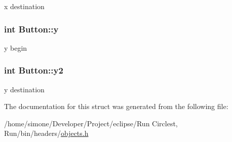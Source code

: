 x destination \hypertarget{struct_button_afff35ce0c47f662c3b096e5b644648a5}{
\subsubsection[{y}]{\setlength{\rightskip}{0pt plus 5cm}int Button\-::y}}\label{struct_button_afff35ce0c47f662c3b096e5b644648a5}
y begin \hypertarget{struct_button_aaa0cda56851a1ad65816d1f6849d6c6f}{
\subsubsection[{y2}]{\setlength{\rightskip}{0pt plus 5cm}int Button\-::y2}}\label{struct_button_aaa0cda56851a1ad65816d1f6849d6c6f}
y destination 

The documentation for this struct was generated from the following file\-:\begin{DoxyCompactItemize}
\item 
/home/simone/\-Developer/\-Project/eclipse/\-Run Circlest, Run/bin/headers/\hyperlink{objects_8h}{objects.\-h}\end{DoxyCompactItemize}
